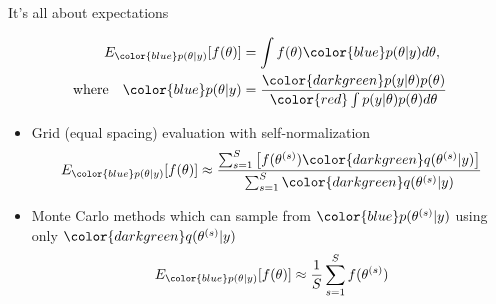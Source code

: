 \documentclass[finnish,english,t]{beamer}
\begin{document}
\begin{frame}

  {\Large\color{navyblue} It's all about expectations}

  \vspace{-1.5\baselineskip}
   \begin{align*}
     E_{\color{blue} p(\theta|y)}[f(\theta)] & = \int f(\theta) {\color{blue} p(\theta|y)} d\theta,\\
     \text{where} \quad
     {\color{blue} p(\theta|y)} & = \frac{\color{darkgreen}p(y|\theta)p(\theta)}{\color{red} \int p(y|\theta)p(\theta) d\theta}
   \end{align*}

 \begin{itemize}
   \vspace{-0.5\baselineskip}
    \item<4-> Grid (equal spacing) evaluation with self-normalization
      \begin{align*}
        E_{\color{blue} p(\theta|y)}[f(\theta)] \approx
        \frac{\sum_{s=1}^S \left[f(\theta^{(s)}){\color{darkgreen}q(\theta^{(s)}|y)}\right]}{\sum_{s=1}^S{\color{darkgreen}q(\theta^{(s)}|y)}}
      \end{align*}
    \item<5-> Monte Carlo methods which can sample from
      ${\color{blue}p(\theta^{(s)}|y)}$ using only
      ${\color{darkgreen}q(\theta^{(s)}|y)}$
         \vspace{-0.5\baselineskip}
      \begin{align*}
        E_{\color{blue} p(\theta|y)}[f(\theta)] \approx \frac{1}{S} \sum_{s=1}^S f(\theta^{(s)})
      \end{align*}
    \end{itemize}
   
\end{frame}
\end{document}
